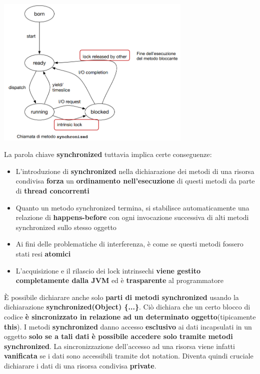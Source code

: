 \documentclass[12pt]{article}
\begin{document}
\begin{center}
    \includegraphics[width = 0.70\textwidth]{Images/83.png}
\end{center}
La parola chiave \textbf{synchronized} tuttavia implica certe conseguenze:
\begin{itemize}
    \item L'introduzione di \textbf{synchronized} nella dichiarazione dei metodi di una risorsa condivisa \textbf{forza} un \textbf{ordinamento nell'esecuzione} di questi metodi da parte di \textbf{thread concorrenti}
    \item Quanto un metodo synchronized termina, si stabilisce automaticamente una relazione di \textbf{happens-before} con ogni invocazione successiva di alti metodi synchronized sullo stesso oggetto
    \item Ai fini delle problematiche di interferenza, è come se questi metodi fossero stati resi \textbf{atomici}
    \item L'acquisizione e il rilascio dei lock intrinsechi \textbf{viene gestito completamente dalla JVM} ed è \textbf{trasparente} al programmatore
\end{itemize}
È possibile dichiarare anche solo \textbf{parti di metodi synchronized} usando la dichiarazione \textbf{synchronized(Object) \{...\}}. Ciò dichiara che un certo blocco di codice \textbf{è sincronizzato in relazione ad un determinato oggetto}(tipicamente \textbf{this}). \newline
I metodi \textbf{synchronized} danno accesso \textbf{esclusivo} ai dati incapsulati in un oggetto \textbf{solo se a tali dati è possibile accedere solo tramite metodi synchronized}. La sincronizzazione dell'accesso ad una risorsa viene infatti \textbf{vanificata} se i dati sono accessibili tramite dot notation. Diventa quindi cruciale dichiarare i dati di una risorsa condivisa \textbf{private}. \newline
\end{document}

